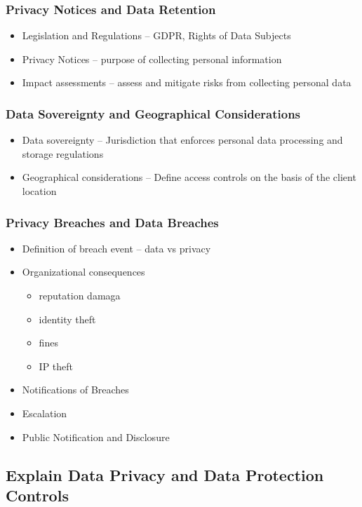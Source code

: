 		\subsubsection {Privacy Notices and Data Retention}
			\begin{itemize}
				\item Legislation and Regulations -- GDPR, Rights of Data Subjects
				\item Privacy Notices -- purpose of collecting personal information
				\item Impact assessments -- assess and mitigate risks from collecting
					personal data
			\end{itemize}
		\subsubsection {Data Sovereignty and Geographical Considerations}
			\begin{itemize}
				\item Data sovereignty -- Jurisdiction that enforces personal data
					processing and storage regulations
				\item Geographical considerations -- Define access controls on the basis
					of the client location
			\end{itemize}
		\subsubsection {Privacy Breaches and Data Breaches}
			\begin{itemize}
				\item Definition of breach event -- data vs privacy
				\item Organizational consequences
					\begin{itemize}
						\item reputation damaga
						\item identity theft
						\item fines
						\item IP theft
					\end{itemize}
				\item Notifications of Breaches
				\item Escalation
				\item Public Notification and Disclosure
			\end{itemize}
	\subsection {Explain Data Privacy and Data Protection Controls}
